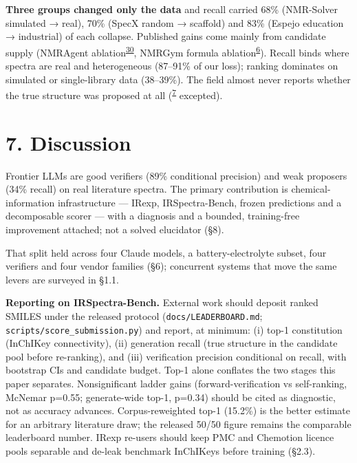 \documentclass[
  10pt,
]{article}
\begin{document}
\textbf{Three groups changed only the data} and recall carried 68\%
(NMR-Solver simulated → real), 70\% (SpecX random → scaffold) and 83\%
(Espejo education → industrial) of each collapse. Published gains come
mainly from candidate supply (NMRAgent
ablation\textsuperscript{\protect\hyperlink{ref-fang2026nmragent}{30}},
NMRGym formula
ablation\textsuperscript{\protect\hyperlink{ref-fang2026nmrgym}{6}}).
Recall binds where spectra are real and heterogeneous (87--91\% of our
loss); ranking dominates on simulated or single-library data (38--39\%).
The field almost never reports whether the true structure was proposed
at all
(\textsuperscript{\protect\hyperlink{ref-priessner2026reasoning}{7}}
excepted).

\hypertarget{discussion}{%
\section{7. Discussion}\label{discussion}}

Frontier LLMs are good verifiers (89\% conditional precision) and weak
proposers (34\% recall) on real literature spectra. The primary
contribution is chemical-information infrastructure --- IRexp,
IRSpectra-Bench, frozen predictions and a decomposable scorer --- with a
diagnosis and a bounded, training-free improvement attached; not a
solved elucidator (§8).

That split held across four Claude models, a battery-electrolyte subset,
four verifiers and four vendor families (§6); concurrent systems that
move the same levers are surveyed in §1.1.

\textbf{Reporting on IRSpectra-Bench.} External work should deposit
ranked SMILES under the released protocol
(\texttt{docs/\hspace{0pt}LEADERBOARD.md};
\texttt{scripts/\hspace{0pt}score\_submission.py}) and report, at
minimum: (i) top-1 constitution (InChIKey connectivity), (ii) generation
recall (true structure in the candidate pool before re-ranking), and
(iii) verification precision conditional on recall, with bootstrap CIs
and candidate budget. Top-1 alone conflates the two stages this paper
separates. Nonsignificant ladder gains (forward-verification vs
self-ranking, McNemar p=0.55; generate-wide top-1, p=0.34) should be
cited as diagnostic, not as accuracy advances. Corpus-reweighted top-1
(15.2\%) is the better estimate for an arbitrary literature draw; the
released 50/50 figure remains the comparable leaderboard number. IRexp
re-users should keep PMC and Chemotion licence pools separable and
de-leak benchmark InChIKeys before training (§2.3).
\end{document}
